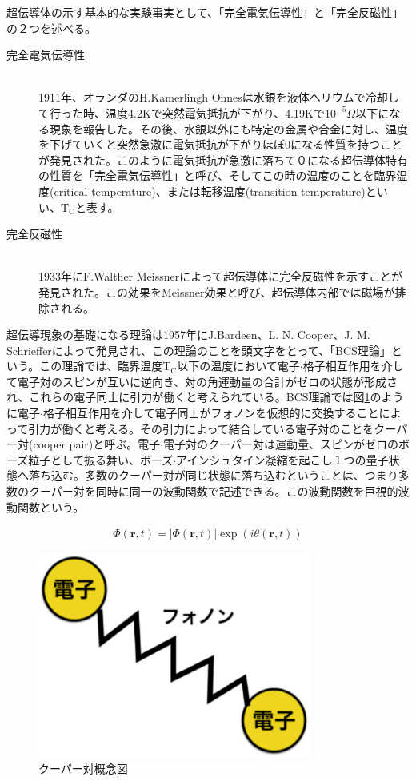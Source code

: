 超伝導体の示す基本的な実験事実として、「完全電気伝導性」と「完全反磁性」の２つを述べる。
	\begin{description}
	\item[完全電気伝導性]\mbox{}\\
		1911年、オランダのH.Kamerlingh Onnesは水銀を液体ヘリウムで冷却して行った時、温度4.2Kで突然電気抵抗が下がり、4.19Kで$10^{-5} \Omega$以下になる現象を報告した。その後、水銀以外にも特定の金属や合金に対し、温度を下げていくと突然急激に電気抵抗が下がりほぼ0になる性質を持つことが発見された。このように電気抵抗が急激に落ちて０になる超伝導体特有の性質を「完全電気伝導性」と呼び、そしてこの時の温度のことを臨界温度(critical temperature)、または転移温度(transition temperature)といい、$\mathrm{T_C}$と表す。
	\item[完全反磁性]\mbox{}\\
		1933年にF.Walther Meissnerによって超伝導体に完全反磁性を示すことが発見された。この効果をMeissner効果と呼び、超伝導体内部では磁場が排除される。
	\end{description}
	
超伝導現象の基礎になる理論は1957年にJ.Bardeen、L. N. Cooper、J. M. Schriefferによって発見され、この理論のことを頭文字をとって、「BCS理論」という。この理論では、臨界温度$\mathrm{T_C}$以下の温度において電子$\cdot$格子相互作用を介して電子対のスピンが互いに逆向き、対の角運動量の合計がゼロの状態が形成され、これらの電子同士に引力が働くと考えられている。BCS理論では図\ref{fig:CooperPair}のように電子$\cdot$格子相互作用を介して電子同士がフォノンを仮想的に交換することによって引力が働くと考える。その引力によって結合している電子対のことをクーパー対(cooper pair)と呼ぶ。電子$\cdot$電子対のクーパー対は運動量、スピンがゼロのボーズ粒子として振る舞い、ボーズ$\cdot$アインシュタイン凝縮を起こし１つの量子状態へ落ち込む。多数のクーパー対が同じ状態に落ち込むということは、つまり多数のクーパー対を同時に同一の波動関数で記述できる。この波動関数を巨視的波動関数という。

\begin{eqnarray}
\Phi (\bm{r},t) = |\Phi (\bm{r},t)| \exp (i \theta (\bm{r},t))
\end{eqnarray}

\begin{figure}[htbp]
  \begin{center}
    \includegraphics[width=9.0cm]{./Chapter/Chapter2/Picture/Cooperpair.eps}
    \caption{クーパー対概念図}
    \label{fig:CooperPair}
  \end{center}
\end{figure}

